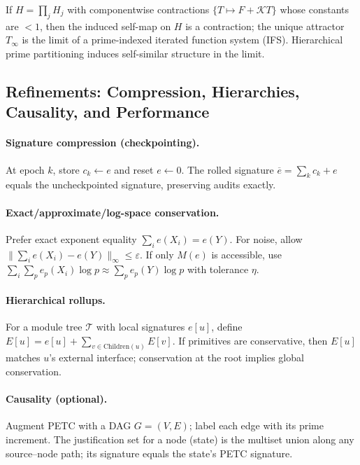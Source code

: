 \documentclass[11pt]{article}
\theoremstyle{definition}
\theoremstyle{remark}
\newcommand{\1}{\mathbf{1}}
\begin{document}
\begin{theorem}
\label{thm:fractal_systems}
If $H=\prod_{j} H_j$ with componentwise contractions $\{T\mapsto F+\mathcal{K}T\}$ whose constants are $<1$, then the induced self-map on $H$ is a contraction; the unique attractor $T_\infty$ is the limit of a prime-indexed iterated function system (IFS). Hierarchical prime partitioning induces self-similar structure in the limit.
\end{theorem}

\subsection{Refinements: Compression, Hierarchies, Causality, and Performance}
\paragraph{Signature compression (checkpointing).}
At epoch $k$, store $c_k\!\gets\!e$ and reset $e\!\gets\!0$. The rolled signature $\overline{e}=\sum_{k} c_k + e$ equals the uncheckpointed signature, preserving audits exactly.

\paragraph{Exact/approximate/log-space conservation.}
Prefer exact exponent equality $\sum_i e(X_i)=e(Y)$. For noise, allow $\|\sum_i e(X_i)-e(Y)\|_\infty\le\varepsilon$. If only $M(e)$ is accessible, use $\sum_i\sum_p e_p(X_i)\log p \approx \sum_p e_p(Y)\log p$ with tolerance $\eta$.

\paragraph{Hierarchical rollups.}
For a module tree $\mathcal{T}$ with local signatures $e[u]$, define $E[u]=e[u]+\sum_{v\in\mathrm{Children}(u)}E[v]$. If primitives are conservative, then $E[u]$ matches $u$'s external interface; conservation at the root implies global conservation.

\paragraph{Causality (optional).}
Augment PETC with a DAG $G=(V,E)$; label each edge with its prime increment. The justification set for a node (state) is the multiset union along any source–node path; its signature equals the state’s PETC signature.
\end{document}

